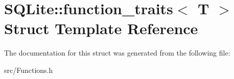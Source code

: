 \hypertarget{struct_s_q_lite_1_1function__traits}{\section{S\-Q\-Lite\-:\-:function\-\_\-traits$<$ T $>$ Struct Template Reference}
\label{struct_s_q_lite_1_1function__traits}
}


The documentation for this struct was generated from the following file\-:\begin{DoxyCompactItemize}
\item 
src/Functions.\-h\end{DoxyCompactItemize}
